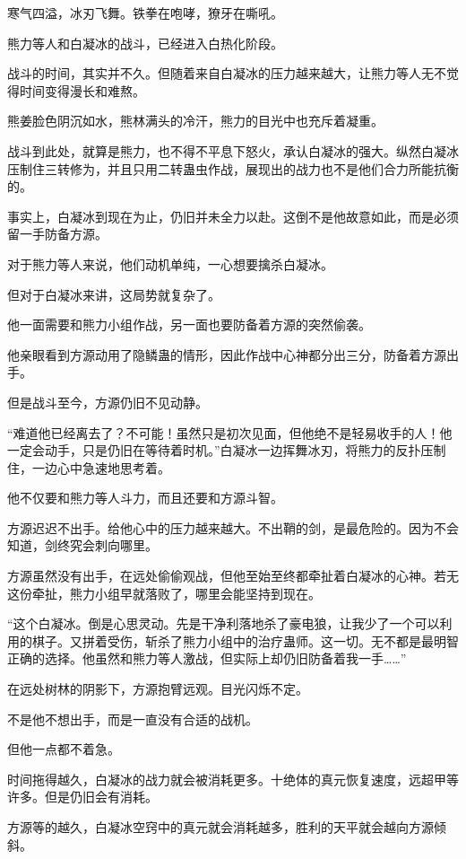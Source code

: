 
\begin{this_body}

寒气四溢，冰刃飞舞。铁拳在咆哮，獠牙在嘶吼。

熊力等人和白凝冰的战斗，已经进入白热化阶段。

战斗的时间，其实并不久。但随着来自白凝冰的压力越来越大，让熊力等人无不觉得时间变得漫长和难熬。

熊姜脸色阴沉如水，熊林满头的冷汗，熊力的目光中也充斥着凝重。

战斗到此处，就算是熊力，也不得不平息下怒火，承认白凝冰的强大。纵然白凝冰压制住三转修为，并且只用二转蛊虫作战，展现出的战力也不是他们合力所能抗衡的。

事实上，白凝冰到现在为止，仍旧并未全力以赴。这倒不是他故意如此，而是必须留一手防备方源。

对于熊力等人来说，他们动机单纯，一心想要擒杀白凝冰。

但对于白凝冰来讲，这局势就复杂了。

他一面需要和熊力小组作战，另一面也要防备着方源的突然偷袭。

他亲眼看到方源动用了隐鳞蛊的情形，因此作战中心神都分出三分，防备着方源出手。

但是战斗至今，方源仍旧不见动静。

“难道他已经离去了？不可能！虽然只是初次见面，但他绝不是轻易收手的人！他一定会动手，只是仍旧在等待着时机。”白凝冰一边挥舞冰刃，将熊力的反扑压制住，一边心中急速地思考着。

他不仅要和熊力等人斗力，而且还要和方源斗智。

方源迟迟不出手。给他心中的压力越来越大。不出鞘的剑，是最危险的。因为不会知道，剑终究会刺向哪里。

方源虽然没有出手，在远处偷偷观战，但他至始至终都牵扯着白凝冰的心神。若无这份牵扯，熊力小组早就落败了，哪里会能坚持到现在。

“这个白凝冰。倒是心思灵动。先是干净利落地杀了豪电狼，让我少了一个可以利用的棋子。又拼着受伤，斩杀了熊力小组中的治疗蛊师。这一切。无不都是最明智正确的选择。他虽然和熊力等人激战，但实际上却仍旧防备着我一手……”

在远处树林的阴影下，方源抱臂远观。目光闪烁不定。

不是他不想出手，而是一直没有合适的战机。

但他一点都不着急。

时间拖得越久，白凝冰的战力就会被消耗更多。十绝体的真元恢复速度，远超甲等许多。但是仍旧会有消耗。

方源等的越久，白凝冰空窍中的真元就会消耗越多，胜利的天平就会越向方源倾斜。


\end{this_body}
